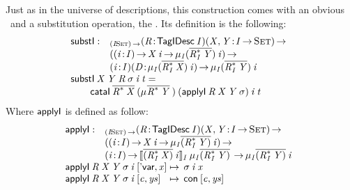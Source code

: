 Just as in the universe of descriptions, this construction comes with
an obvious \return\ and a substitution operation, the \bind. Its
definition is the following:
%
\[\stk{
\begin{array}{@{}ll}
\substI : & _{\PI{\V{I}}{\Set}}
            \PITEL{\V{R}}{\TagIDesc{\V{I}}}
            \PI{\V{X}, \V{Y}}{\V{I} \To \Set} \\
          & (\PI{\V{i}}{\V{I}} \V{X}\:\V{i} \To 
                               \IMu{\V{I}}{(\toIDesc{\FreeIMonad{\V{R}}{\V{I}}{\V{Y}}})}{\V{i}}) \To \\
          & \PITEL{\V{i}}{\V{I}}
            \PITEL{\V{D}}{\IMu{\V{I}}{(\toIDesc{\FreeIMonad{\V{R}}{\V{I}}{\V{X}}})}{\V{i}}} \To
            \IMu{\V{I}}{(\toIDesc{\FreeIMonad{\V{R}}{\V{I}}{\V{Y}}})}{\V{i}}
\end{array} \\
\substI\: \V{X}\: \V{Y}\: \V{R}\: \V{\sigma}\: \V{i}\: \V{t} = \\
\qquad    \cataI\: \toIDesc{\FreeIMonad{\V{R}}{}{\V{X}}}\:
                      (\IMu{}{\toIDesc{\FreeIMonad{\V{R}}{}{\V{Y}}}})\:
                      (\F{applyI}\: \V{R}\: \V{X}\: \V{Y}\: \V{\sigma})\:
                      \V{i}\:
                      \V{t} 
}\]
% 
Where  $\F{applyI}$ is defined as follow:
%
\[\stk{
\begin{array}{@{}ll}
\F{applyI} : & _{\PI{\V{I}}{\Set}}
            \PITEL{\V{R}}{\TagIDesc{\V{I}}}
            \PI{\V{X}, \V{Y}}{\V{I} \To \Set} \\
          & (\PI{\V{i}}{\V{I}} \V{X}\: \V{i} \To \IMu{\V{I}}{\toIDesc{(\FreeIMonad{\V{R}}{\V{I}}{\V{Y}})}}{\V{i}}) \To \\
          & \PI{\V{i}}{\V{I}} 
            \idescop{\toIDesc{(\FreeIMonad{\V{R}}
                                         {\V{I}}
                                         {\V{X}})}\: 
                     \V{i}}
                    {\V{I}}
{\IMu{\V{I}}{\toIDesc{(\FreeIMonad{\V{R}}{\V{I}}{\V{Y}})}}} \To 
           \IMu{\V{I}}{\toIDesc{(\FreeIMonad{\V{R}}{\V{I}}{\V{Y}})}}{\V{i}}
\end{array} \\
\begin{array}{@{}l@{\:\mapsto\:\:}l}
\F{applyI}\: \V{R}\: \V{X}\: \V{Y}\: \V{\sigma}\: \V{i}\: \pair{\SYMBDVar}{\V{x}}{}   & \V{\sigma}\: \V{i}\: \V{x}                   \\
\F{applyI}\: \V{R}\: \V{X}\: \V{Y}\: \V{\sigma}\: \V{i}\: \pair{\V{c}}{\V{ys}}{} & \Con{\pair{\V{c}}{\V{ys}}{}}
\end{array}
}\]
 

